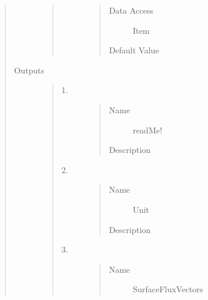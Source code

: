 \documentclass[letterpaper,10pt,english]{sphinxmanual}
\begin{document}
\begin{quote}
\begin{description}
\begin{quote}
\begin{description}
\begin{quote}
\begin{description}
\item[{Data Access}] \leavevmode
Item

\item[{Default Value}] \leavevmode
{}

\end{description}\end{quote}

\end{description}\end{quote}

\item[{Outputs}] \leavevmode\begin{quote}\begin{description}
\item[{1.}] \leavevmode\begin{quote}\begin{description}
\item[{Name}] \leavevmode
readMe!

\item[{Description}] \leavevmode
{}

\end{description}\end{quote}

\item[{2.}] \leavevmode\begin{quote}\begin{description}
\item[{Name}] \leavevmode
Unit

\item[{Description}] \leavevmode
{}

\end{description}\end{quote}

\item[{3.}] \leavevmode\begin{quote}\begin{description}
\item[{Name}] \leavevmode
SurfaceFluxVectors


\end{description}
\end{quote}
\end{description}
\end{quote}
\end{description}
\end{quote}
\end{document}
